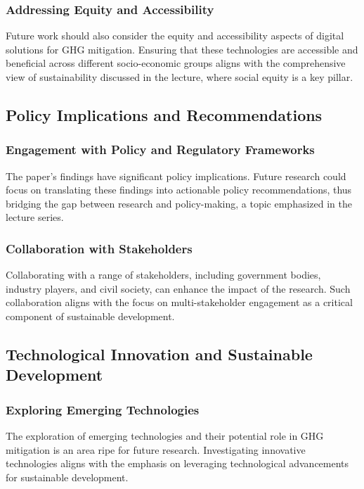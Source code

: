 \documentclass[conference,compsoc]{IEEEtran}
\begin{document}
\subsubsection{Addressing Equity and Accessibility}

Future work should also consider the equity and accessibility aspects of digital solutions for GHG mitigation. Ensuring that these technologies are accessible and beneficial across different socio-economic groups aligns with the comprehensive view of sustainability discussed in the lecture, where social equity is a key pillar.

\subsection{Policy Implications and Recommendations}

\subsubsection{Engagement with Policy and Regulatory Frameworks}

The paper's findings have significant policy implications. Future research could focus on translating these findings into actionable policy recommendations, thus bridging the gap between research and policy-making, a topic emphasized in the lecture series.

\subsubsection{Collaboration with Stakeholders}

Collaborating with a range of stakeholders, including government bodies, industry players, and civil society, can enhance the impact of the research. Such collaboration aligns with the  focus on multi-stakeholder engagement as a critical component of sustainable development.

\subsection{Technological Innovation and Sustainable Development}

\subsubsection{Exploring Emerging Technologies}

The exploration of emerging technologies and their potential role in GHG mitigation is an area ripe for future research. Investigating innovative technologies aligns with the  emphasis on leveraging technological advancements for sustainable development.
\end{document}
